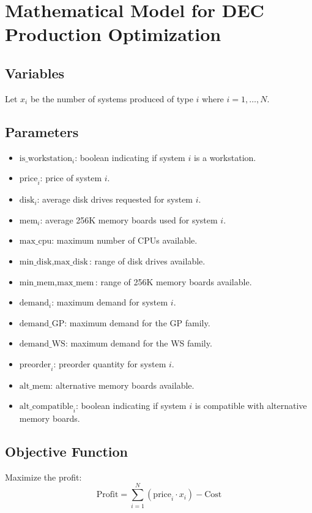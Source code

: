 \documentclass{article}
\begin{document}
\section*{Mathematical Model for DEC Production Optimization}

\subsection*{Variables}
Let \( x_i \) be the number of systems produced of type \( i \) where \( i = 1, \ldots, N \).

\subsection*{Parameters}
\begin{itemize}
    \item \( \text{is\_workstation}_i \): boolean indicating if system \( i \) is a workstation.
    \item \( \text{price}_i \): price of system \( i \).
    \item \( \text{disk}_i \): average disk drives requested for system \( i \).
    \item \( \text{mem}_i \): average 256K memory boards used for system \( i \).
    \item \( \text{max\_cpu} \): maximum number of CPUs available.
    \item \( \text{min\_disk}, \text{max\_disk} \): range of disk drives available.
    \item \( \text{min\_mem}, \text{max\_mem} \): range of 256K memory boards available.
    \item \( \text{demand}_i \): maximum demand for system \( i \).
    \item \( \text{demand\_GP} \): maximum demand for the GP family.
    \item \( \text{demand\_WS} \): maximum demand for the WS family.
    \item \( \text{preorder}_i \): preorder quantity for system \( i \).
    \item \( \text{alt\_mem} \): alternative memory boards available.
    \item \( \text{alt\_compatible}_i \): boolean indicating if system \( i \) is compatible with alternative memory boards.
\end{itemize}

\subsection*{Objective Function}
Maximize the profit:
\[
\text{Profit} = \sum_{i=1}^{N} (\text{price}_i \cdot x_i) - \text{Cost}
\]
\end{document}
